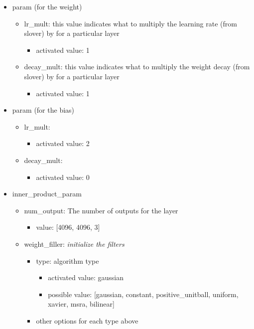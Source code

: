\documentclass[11pt]{article}
\begin{document}
\begin{itemize}
	\item param (for the weight)
	\begin{itemize}
		\item lr\_mult: this value indicates what to multiply the learning rate (from slover) by for a particular layer
			\begin{itemize}
				\item activated value: 1
			\end{itemize}
		\item decay\_mult: this value indicates what to multiply the weight decay (from slover) by for a particular layer
			\begin{itemize}
				\item activated value: 1
			\end{itemize}
	\end{itemize}
	\item param (for the bias)
	\begin{itemize}
		\item lr\_mult: 
			\begin{itemize}
				\item activated value: 2
			\end{itemize}
		\item decay\_mult:
			\begin{itemize}
				\item activated value: 0
			\end{itemize}
	\end{itemize}
	\item inner\_product\_param
	\begin{itemize}
		\item num\_output: The number of outputs for the layer
		\begin{itemize}
			\item value: [4096, 4096, 3]
		\end{itemize}
		\item weight\_filler: \textit{initialize the filters}
	\begin{itemize}
		\item type: algorithm type
		\begin{itemize}
			\item activated value: gaussian
			\item possible value: [gaussian, constant, positive\_unitball, uniform, xavier, msra, bilinear]
		\end{itemize}
		\item other options for each type above

\end{itemize}
\end{itemize}
\end{itemize}
\end{document}
